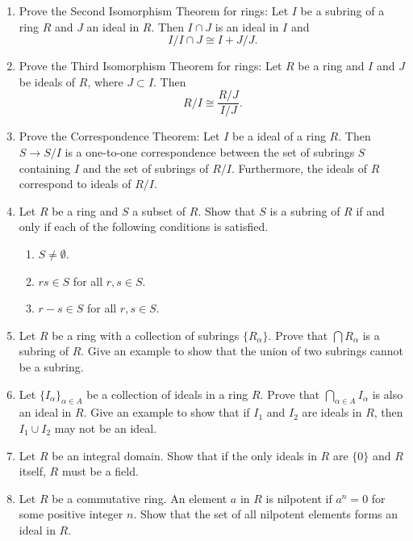 {\begin{enumerate}
 
\bf\item\rm
Prove the Second Isomorphism Theorem for rings: Let $I$ be a  subring
of a ring $R$  and  $J$ an ideal in $R$.  Then $I \cap J$ is an ideal
in $I$ and 
\[
I / I \cap J \cong I + J /J.
\]
 
 
\bf\item\rm
Prove the Third Isomorphism Theorem for rings: Let $R$ be a ring and
$I$ and $J$ be ideals of $R$, where $J \subset I$.  Then
\[
R/I \cong \frac{R/J}{I/J}.
\]
 
 
\bf\item\rm
Prove the Correspondence Theorem:
Let $I$ be a ideal of a ring $R$. Then $S \rightarrow S/I$ is a
one-to-one correspondence between the set of subrings $S$ containing
$I$  and the set of subrings of $R/I$. Furthermore, the ideals
of $R$ correspond to ideals of $R/I$.
 
 
 
\bf\item\rm
Let $R$ be a ring and $S$ a subset of $R$.  Show that $S$ is a subring
of $R$ if and only if each of the following conditions is satisfied. 
\begin{enumerate}
 
 \bf\item\rm
$S \neq \emptyset$. 
 
 \bf\item\rm
$rs \in S$ for all $r, s \in S$.
 
 \bf\item\rm
$r-s \in S$ for all $r, s \in S$.
 
\end{enumerate}
 
 
\bf\item\rm
Let $R$ be a ring with a collection of subrings $\{ R_{\alpha} \}$.
Prove that $\bigcap  R_{\alpha}$ is a subring of $R$.  Give an example
to show that the union of two subrings cannot be a subring.
 
 
\bf\item\rm
Let $\{ I_{\alpha} \}_{\alpha \in A}$ be a collection of ideals in a
ring $R$.  Prove that $\bigcap_{\alpha \in A} I_{\alpha}$ is also an
ideal in $R$. Give an example to show that if $I_1$ and $I_2$ are
ideals in $R$, then $I_1 \cup I_2$ may not be an ideal. 
 
 
\bf\item\rm
Let $R$ be an integral domain.  Show that if the only ideals in $R$ 
are $\{ 0 \}$ and $R$ itself, $R$ must be a field. 
 
 
\bf\item\rm
Let $R$ be a commutative ring.  An element $a$ in $R$ is {\bfi
nilpotent\/} if $a^n =
0$ for some positive integer $n$. Show that the set of all nilpotent
elements forms an ideal in $R$.   
 

\end{enumerate}}

